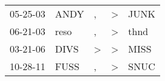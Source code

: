 \begin{supertabular}{lllll}
 05-25-03 &  ANDY &             , &  \textgreater &  JUNK \\
 06-21-03 &  reso &             , &  \textgreater &  thnd \\
 03-21-06 &  DIVS &  \textgreater &  \textgreater &  MISS \\
 10-28-11 &  FUSS &             , &  \textgreater &  SNUC \\
\end{supertabular}
